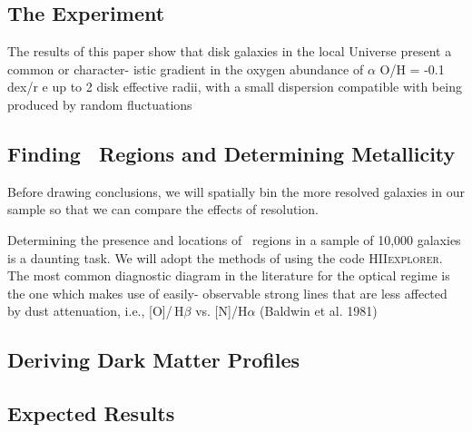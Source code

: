 \documentclass[11pt, a4paper, onecolumn]{article}
\begin{document}
\begin{multicols}{2}

\section{The Experiment}


    \citet{sanchez12} The results of this paper show that disk galaxies in the
    local Universe present a common or character- istic gradient in the oxygen
    abundance of $\alpha$ O/H = -0.1 dex/r e up to 2 disk effective radii,
    with a small dispersion compatible with being produced by random
    fluctuations


\subsection{Finding \hii\ Regions and Determining Metallicity}

    Before drawing conclusions, we will spatially bin the more resolved
    galaxies in our sample so that we can compare the effects of resolution.

    Determining the presence and locations of \hii\ regions in a sample of
    10,000 galaxies is a daunting task. We will adopt the methods of
    \citet{sanchez12} using the code \textsc{HIIexplorer}. The most common
    diagnostic diagram in the literature for the optical regime is the one
    which makes use of easily- observable strong lines that are less affected
    by dust attenuation, i.e., [O\iii]/\,H$\beta$ vs. [N\ii]/H$\alpha$
    (Baldwin et al. 1981)

\subsection{Deriving Dark Matter Profiles}



\subsection{Expected Results}


\end{multicols}
\end{document}
